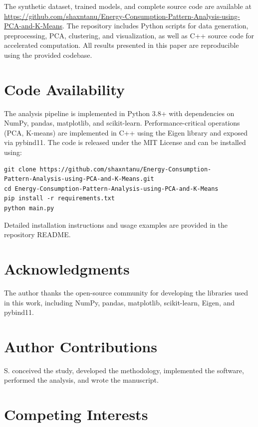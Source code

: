 \documentclass[11pt]{article}
\begin{document}
The synthetic dataset, trained models, and complete source code are available at \url{https://github.com/shaxntanu/Energy-Consumption-Pattern-Analysis-using-PCA-and-K-Means}. The repository includes Python scripts for data generation, preprocessing, PCA, clustering, and visualization, as well as C++ source code for accelerated computation. All results presented in this paper are reproducible using the provided codebase.

\section*{Code Availability}

The analysis pipeline is implemented in Python 3.8+ with dependencies on NumPy, pandas, matplotlib, and scikit-learn. Performance-critical operations (PCA, K-means) are implemented in C++ using the Eigen library and exposed via pybind11. The code is released under the MIT License and can be installed using:

\begin{verbatim}
git clone https://github.com/shaxntanu/Energy-Consumption-
Pattern-Analysis-using-PCA-and-K-Means.git
cd Energy-Consumption-Pattern-Analysis-using-PCA-and-K-Means
pip install -r requirements.txt
python main.py
\end{verbatim}

Detailed installation instructions and usage examples are provided in the repository README.

\section*{Acknowledgments}

The author thanks the open-source community for developing the libraries used in this work, including NumPy, pandas, matplotlib, scikit-learn, Eigen, and pybind11.

\section*{Author Contributions}

S. conceived the study, developed the methodology, implemented the software, performed the analysis, and wrote the manuscript.

\section*{Competing Interests}
\end{document}
